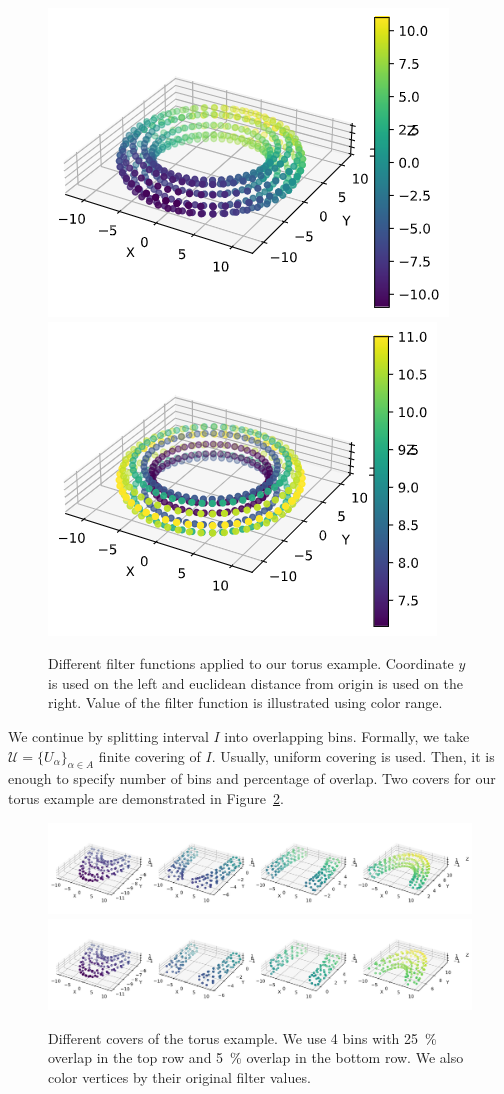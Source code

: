 \documentclass{article}
\begin{document}
\begin{figure}[ht]
    \centering
    \includegraphics[width=0.4\columnwidth]{torus-y-coor}
    \includegraphics[width=0.4\columnwidth]{torus-distance-from-origin}
    \caption{Different filter functions applied to our torus example.
        Coordinate $y$ is used on the left and euclidean distance from origin is used on the right.
        Value of the filter function is illustrated using color range.}
    \label{fig:torus-filter}
\end{figure}

We continue by splitting interval $I$ into overlapping bins.
Formally, we take $\mathcal{U} = \{ U_\alpha \}_{\alpha \in A}$ finite covering of $I$.
Usually, uniform covering is used.
Then, it is enough to specify number of bins and percentage of overlap.
Two covers for our torus example are demonstrated in Figure~\ref{fig:torus-cover}.

\begin{figure}[ht]
    \centering
    \includegraphics[width=0.9\columnwidth]{torus-partition-4-25}
    \includegraphics[width=0.9\columnwidth]{torus-partition-4-05}
    \caption{Different covers of the torus example.
        We use 4 bins with 25~\% overlap in the top row and 5~\% overlap in the bottom row.
        We also color vertices by their original filter values.}
    \label{fig:torus-cover}
\end{figure}
\end{document}
